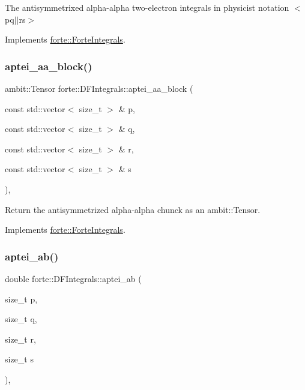 The antisymmetrixed alpha-\/alpha two-\/electron integrals in physicist notation $<$pq$\vert$$\vert$rs$>$ 



Implements \mbox{\hyperlink{classforte_1_1_forte_integrals_afc84c157025b56ee0f8e3b1abe1c0a5f}{forte\+::\+Forte\+Integrals}}.

\mbox{\label{classforte_1_1_d_f_integrals_a2dc1ace8715b3c5a9b7c9da4afbeee44}} 
\subsubsection{\texorpdfstring{aptei\+\_\+aa\+\_\+block()}{aptei\_aa\_block()}}
{\footnotesize\ttfamily ambit\+::\+Tensor forte\+::\+D\+F\+Integrals\+::aptei\+\_\+aa\+\_\+block (\begin{DoxyParamCaption}\item[{const std\+::vector$<$ size\+\_\+t $>$ \&}]{p,  }\item[{const std\+::vector$<$ size\+\_\+t $>$ \&}]{q,  }\item[{const std\+::vector$<$ size\+\_\+t $>$ \&}]{r,  }\item[{const std\+::vector$<$ size\+\_\+t $>$ \&}]{s }\end{DoxyParamCaption})\hspace{0.3cm}{\ttfamily [override]}, {\ttfamily [virtual]}}



Return the antisymmetrized alpha-\/alpha chunck as an ambit\+::\+Tensor. 



Implements \mbox{\hyperlink{classforte_1_1_forte_integrals_ac20ae649b8cfe116f8583d676e43da27}{forte\+::\+Forte\+Integrals}}.

\mbox{\label{classforte_1_1_d_f_integrals_a01ec88efadb6b8b28bae6c5c3fbfd389}} 
\subsubsection{\texorpdfstring{aptei\+\_\+ab()}{aptei\_ab()}}
{\footnotesize\ttfamily double forte\+::\+D\+F\+Integrals\+::aptei\+\_\+ab (\begin{DoxyParamCaption}\item[{size\+\_\+t}]{p,  }\item[{size\+\_\+t}]{q,  }\item[{size\+\_\+t}]{r,  }\item[{size\+\_\+t}]{s }\end{DoxyParamCaption})\hspace{0.3cm}{\ttfamily [override]}, {\ttfamily [virtual]}}



